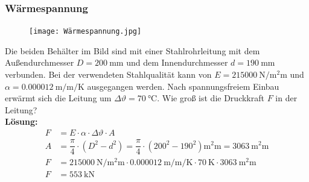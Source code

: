 \documentclass{beamer}
\begin{document}
\frame
{
\frametitle{Wärmespannung}
\begin{figure}
	\texttt{[image: Wärmespannung.jpg]}
\end{figure}
Die beiden Behälter im Bild sind mit einer Stahlrohrleitung mit dem Außendurchmesser $D=\SI{200}{\milli\meter}$ und dem Innendurchmesser $d=\SI{190}{\milli\meter}$ verbunden. Bei der verwendeten Stahlqualität kann von $E=\SI{215000}{\newton\per\square\milli\meter} $ und $\alpha=\SI{0.000012}{\meter\per\meter\per\kelvin}$ ausgegangen werden. Nach spannungsfreiem Einbau erwärmt sich die Leitung um $\Delta\vartheta=\SI{70}{\celsius}$. Wie groß ist die Druckkraft $F$ in der Leitung?\\
\textbf{Lösung:}
\begin{align*}
F&=E\cdot\alpha\cdot\Delta\vartheta\cdot A\\
A&=\dfrac{\pi}{4}\cdot(D^{2}-d^{2})=\dfrac{\pi}{4}\cdot(200^{2}-190^{2})\si{\square\milli\meter}=\SI{3063}{\square\milli\meter}\\
F&=\SI{215000}{\newton\per\square\milli\meter}\cdot\SI{0.000012}{\meter\per\meter\per\kelvin}\cdot\SI{70}{\kelvin}\cdot\SI{3063}{\square\milli\meter}\\
F&=\SI{553}{\kilo\newton}
\end{align*}
}
\end{document}
